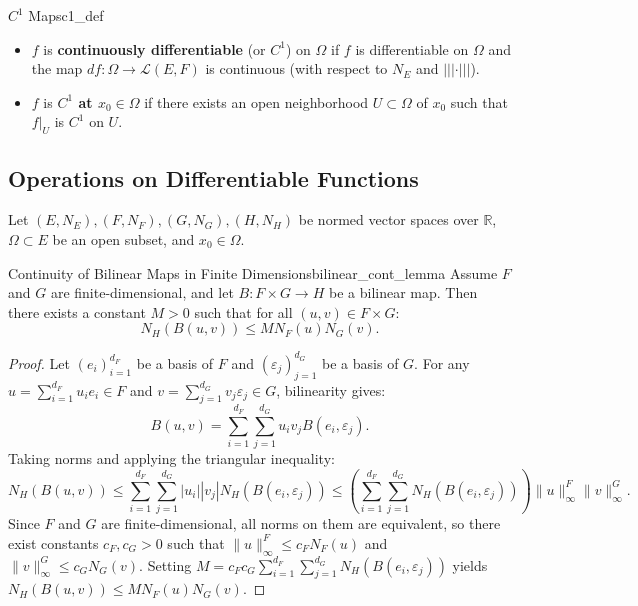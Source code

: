 \documentclass[11pt, a4paper]{article}
\newcommand{\R}{\mathbb{R}}
\begin{document}
\begin{definition}{$C^1$ Maps}{c1_def}
\begin{itemize}
    \item $f$ is \textbf{continuously differentiable} (or $C^1$) on $\Omega$ if $f$ is differentiable on $\Omega$ and the map $df: \Omega \to \mathcal{L}(E, F)$ is continuous (with respect to $N_E$ and $|||\cdot|||$).
    \item $f$ is \textbf{$C^1$ at $x_0 \in \Omega$} if there exists an open neighborhood $U \subset \Omega$ of $x_0$ such that $f|_U$ is $C^1$ on $U$.
\end{itemize}
\end{definition}

\subsection{Operations on Differentiable Functions}
Let $(E, N_E), (F, N_F), (G, N_G), (H, N_H)$ be normed vector spaces over $\R$, $\Omega \subset E$ be an open subset, and $x_0 \in \Omega$.

\begin{lemma}{Continuity of Bilinear Maps in Finite Dimensions}{bilinear_cont_lemma}
Assume $F$ and $G$ are finite-dimensional, and let $B: F \times G \to H$ be a bilinear map. Then there exists a constant $M > 0$ such that for all $(u, v) \in F \times G$:
\[
N_H(B(u, v)) \le M N_F(u) N_G(v).
\]
\end{lemma}
\begin{proof}
Let $(e_i)_{i=1}^{d_F}$ be a basis of $F$ and $(\varepsilon_j)_{j=1}^{d_G}$ be a basis of $G$. For any $u = \sum_{i=1}^{d_F} u_i e_i \in F$ and $v = \sum_{j=1}^{d_G} v_j \varepsilon_j \in G$, bilinearity gives:
\[
B(u, v) = \sum_{i=1}^{d_F} \sum_{j=1}^{d_G} u_i v_j B(e_i, \varepsilon_j).
\]
Taking norms and applying the triangular inequality:
\[
N_H(B(u, v)) \le \sum_{i=1}^{d_F} \sum_{j=1}^{d_G} |u_i| |v_j| N_H(B(e_i, \varepsilon_j)) \le \left(\sum_{i=1}^{d_F} \sum_{j=1}^{d_G} N_H(B(e_i, \varepsilon_j))\right) \|u\|_\infty^F \|v\|_\infty^G.
\]
Since $F$ and $G$ are finite-dimensional, all norms on them are equivalent, so there exist constants $c_F, c_G > 0$ such that $\|u\|_\infty^F \le c_F N_F(u)$ and $\|v\|_\infty^G \le c_G N_G(v)$. Setting $M = c_F c_G \sum_{i=1}^{d_F} \sum_{j=1}^{d_G} N_H(B(e_i, \varepsilon_j))$ yields $N_H(B(u, v)) \le M N_F(u) N_G(v)$.
\end{proof}
\end{document}
